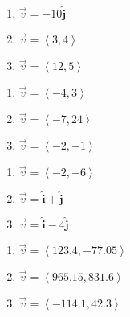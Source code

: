 \begin{multicols}{3}

\begin{enumerate}

\setcounter{enumi}{\value{HW}}

\item  $\vec{v} = -10 \bm\hat{\text{j}}$
\item  $\vec{v} = \left< 3,4\right>$
\item  $\vec{v} = \left<12, 5\right>$

\setcounter{HW}{\value{enumi}}

\end{enumerate}

\end{multicols}

\begin{multicols}{3}

\begin{enumerate}

\setcounter{enumi}{\value{HW}}

\item $\vec{v} = \left<-4, 3 \right>$
\item  $\vec{v} = \left<-7, 24\right>$
\item $\vec{v} = \left<-2, -1 \right>$

\setcounter{HW}{\value{enumi}}

\end{enumerate}

\end{multicols}

\begin{multicols}{3}

\begin{enumerate}

\setcounter{enumi}{\value{HW}}

\item  $\vec{v} = \left<-2, -6\right>$
\item  $\vec{v} = \bm\hat{\text{i}} + \bm\hat{\text{j}}$
\item  $\vec{v} = \bm\hat{\text{i}} - 4\bm\hat{\text{j}}$

\setcounter{HW}{\value{enumi}}

\end{enumerate}

\end{multicols}

\begin{multicols}{3}

\begin{enumerate}

\setcounter{enumi}{\value{HW}}

\item  $\vec{v} = \left<123.4, -77.05\right>$
\item  $\vec{v} = \left<965.15, 831.6\right>$
\item  $\vec{v} = \left<-114.1, 42.3\right>$ \label{findmaganglelast}

\setcounter{HW}{\value{enumi}}

\end{enumerate}

\end{multicols}

